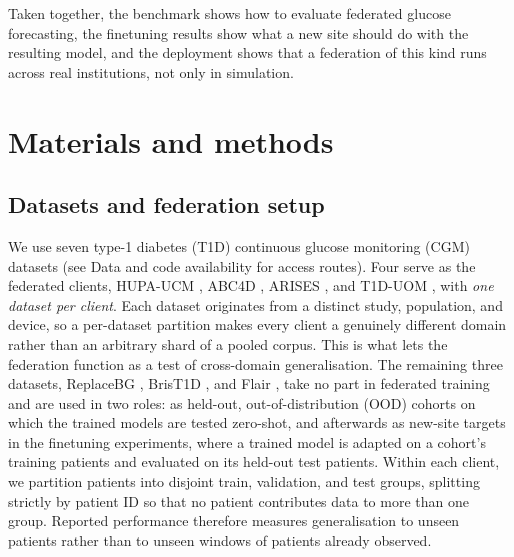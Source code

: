 \documentclass[10pt,letterpaper]{article}
\begin{document}
Taken together, the benchmark shows how to evaluate federated glucose
forecasting, the finetuning results show what a new site should do with the
resulting model, and the deployment shows that a federation of this kind
runs across real institutions, not only in simulation.

\section*{Materials and methods}

\subsection*{Datasets and federation setup}

We use seven type-1 diabetes (T1D) continuous glucose
monitoring (CGM) datasets (see Data and code availability for access routes).
Four serve as the federated clients, HUPA-UCM \cite{hidalgo2024hupaucm},
ABC4D \cite{abc4d_nct}, ARISES \cite{zhu2022arises}, and T1D-UOM
\cite{alsuhaymi2025t1duom}, with \emph{one dataset per client}. Each dataset
originates from a distinct study, population, and device, so a per-dataset
partition makes every client a genuinely different domain rather than an
arbitrary shard of a pooled corpus. This is what lets the federation function as
a test of cross-domain generalisation. The remaining three datasets,
ReplaceBG \cite{aleppo2017replacebg}, BrisT1D \cite{james2025brist1d}, and Flair
\cite{jaeb_flair}, take no part in federated training and are used in two
roles: as held-out, out-of-distribution (OOD) cohorts on which the trained
models are tested zero-shot, and afterwards as new-site targets in the
finetuning experiments, where a trained model is adapted on a cohort's
training patients and evaluated on its held-out test patients. Within
each client, we partition patients
into disjoint train, validation, and test groups, splitting strictly by
patient ID so that no patient contributes data to more than one group. Reported performance therefore measures generalisation to
unseen patients rather than to unseen windows of patients already observed.
\end{document}
